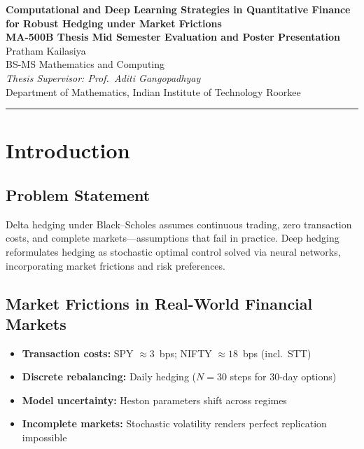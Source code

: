 \documentclass[11pt]{article}
\begin{document}
\begin{center}
{\LARGE\bfseries\color{ppurple} Computational and Deep Learning Strategies in Quantitative Finance\\[3pt] for Robust Hedging under Market Frictions}\\[10pt]
{\large\bfseries MA-500B Thesis Mid Semester Evaluation and Poster Presentation}\\[8pt]
{\large Pratham Kailasiya} \\[2pt]
{\normalsize BS-MS Mathematics and Computing}\\[2pt]
{\normalsize\itshape Thesis Supervisor: Prof.\ Aditi Gangopadhyay}\\[2pt]
{\normalsize Department of Mathematics, Indian Institute of Technology Roorkee}\\[6pt]
\rule{0.8\linewidth}{1pt}
\end{center}

\section{Introduction}

\subsection{Problem Statement}
Delta hedging under Black--Scholes assumes continuous trading, zero transaction costs, and complete markets---assumptions that fail in practice. Deep hedging~\citep{buehler2019deep} reformulates hedging as stochastic optimal control solved via neural networks, incorporating market frictions and risk preferences.

\subsection{Market Frictions in Real-World Financial Markets}
\begin{itemize}[noitemsep,leftmargin=*]
\item \textbf{Transaction costs:} SPY $\approx 3$~bps; NIFTY $\approx 18$~bps (incl.\ STT)
\item \textbf{Discrete rebalancing:} Daily hedging ($N{=}30$ steps for 30-day options)
\item \textbf{Model uncertainty:} Heston parameters shift across regimes
\item \textbf{Incomplete markets:} Stochastic volatility renders perfect replication impossible
\end{itemize}
\end{document}
